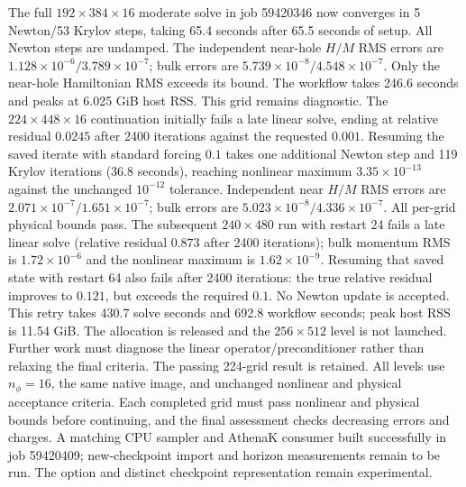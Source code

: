 \documentclass[aps,prd,preprint,notitlepage,nofootinbib]{revtex4-2}
\begin{document}
The full $192\times384\times16$ moderate solve in job 59420346 now converges
in 5 Newton/53 Krylov steps, taking 65.4 seconds after 65.5 seconds of setup.
All Newton steps are undamped. The independent near-hole $H/M$ RMS errors
are $1.128\times10^{-6}/3.789\times10^{-7}$; bulk errors are
$5.739\times10^{-8}/4.548\times10^{-7}$. Only the near-hole Hamiltonian RMS
exceeds its bound. The workflow takes 246.6 seconds and peaks at 6.025 GiB
host RSS. This grid remains diagnostic. The $224\times448\times16$ continuation
initially fails a late linear solve, ending at relative residual $0.0245$
after 2400 iterations against the requested $0.001$. Resuming the saved
iterate with standard forcing $0.1$ takes one additional Newton step and
119 Krylov iterations (36.8 seconds), reaching nonlinear maximum
$3.35\times10^{-13}$ against the unchanged $10^{-12}$ tolerance.
Independent near $H/M$ RMS errors are $2.071\times10^{-7}/1.651\times10^{-7}$;
bulk errors are $5.023\times10^{-8}/4.336\times10^{-7}$. All per-grid physical
bounds pass. The subsequent $240\times480$ run with restart 24 fails a late
linear solve (relative residual $0.873$ after 2400 iterations); bulk momentum
RMS is $1.72\times10^{-6}$ and the nonlinear maximum is $1.62\times10^{-9}$.
Resuming that saved state with restart 64 also fails after 2400 iterations:
the true relative residual improves to $0.121$, but exceeds the required
$0.1$. No Newton update is accepted. This retry takes 430.7 solve seconds
and 692.8 workflow seconds; peak host RSS is 11.54 GiB. The allocation is
released and the $256\times512$ level is not launched. Further work must
diagnose the linear operator/preconditioner rather than relaxing the final
criteria. The passing 224-grid result is retained. All levels use $n_\phi=16$, the same
native image, and unchanged nonlinear and physical acceptance criteria.
Each completed grid must pass nonlinear and physical bounds before
continuing, and the final assessment checks decreasing errors and charges.
A matching CPU sampler and AthenaK consumer built successfully in job
59420409; new-checkpoint import and horizon measurements remain to be run.
The option and distinct checkpoint representation remain experimental.
\end{document}
